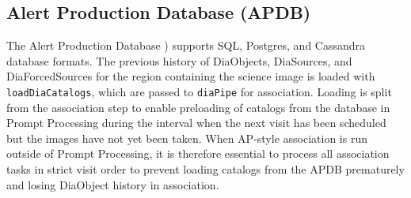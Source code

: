 \subsection{Alert Production Database (APDB)}
\label{sec:apdb}

The Alert Production Database \citep[APDB;][]{DMTN-293}) supports SQL, Postgres, and Cassandra database formats.
The previous history of DiaObjects, DiaSources, and DiaForcedSources for the region containing the science image is loaded with \texttt{loadDiaCatalogs}, which are passed to \texttt{diaPipe} for association.
Loading is split from the association step to enable preloading of catalogs from the database in Prompt Processing during the interval when the next visit has been scheduled but the images have not yet been taken.
When AP-style association is run outside of Prompt Processing, it is therefore essential to process all association tasks in strict visit order to prevent loading catalogs from the APDB prematurely and losing DiaObject history in association.
